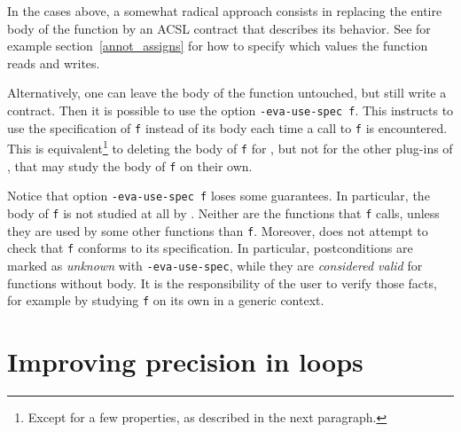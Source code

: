 \documentclass{frama-c-book}
\begin{document}
In the cases above, a somewhat radical
approach consists in replacing the entire body of the function
by an ACSL contract that describes its behavior. See for example
section~\ref{annot_assigns} for how to specify which values the function
reads and writes.

Alternatively, one can leave the body of the function untouched, but
still write a contract. Then it is possible to use the option
\verb+-eva-use-spec f+. This instructs \Eva{} to use the
specification of \verb+f+ instead of its body each time a call to
\verb+f+ is encountered. This is equivalent\footnote{Except for a few
  properties, as described in the next paragraph.} to deleting the body
of \verb+f+ for \Eva{}, but not for the other plug-ins of \FramaC,
that may study the body of \verb+f+ on their own.

Notice that option \verb+-eva-use-spec f+ loses some guarantees. In particular,
the body of \verb+f+ is not studied at all by \Eva{}. Neither
are the functions that \verb+f+ calls, unless they are used by some other
functions than \verb+f+. Moreover, \Eva{} does not attempt
to check that \verb+f+ conforms to its specification. In particular,
postconditions are marked as {\em unknown} with \verb+-eva-use-spec+,
while they are {\em considered valid} for functions without body.
It is the responsibility
of the user to verify those facts, for example by studying \verb+f+
on its own in a generic context.



%

\section{Improving precision in loops}
\label{boucles-traitement}
\end{document}
